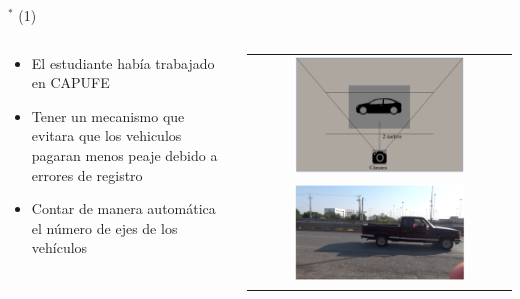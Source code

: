 
\begin{frame}{$^*$  (1)}
\begin{columns}
\begin{column}{0.6\textwidth}
	\begin{itemize}
		\item El estudiante había trabajado en CAPUFE
        \item Tener un mecanismo que evitara que los vehiculos pagaran menos peaje debido a errores de registro
		\item Contar de manera automática el número de ejes de los vehículos
	\end{itemize}
\end{column}
\begin{column}{0.4\textwidth}  
\begin{center}
     \begin{tabular}{c}
\includegraphics[width=0.68\textwidth]{2014_Llantas/figs/LuisRodolfo1}\\
\includegraphics[width=0.68\textwidth]{2014_Llantas/figs/LuisRodolfo2}\\         
      \end{tabular}
\end{center}
\end{column} 
\end{columns} 
\end{frame}


